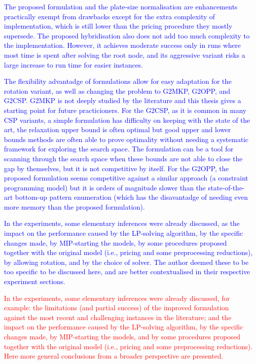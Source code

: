 \documentclass[ppgc,tese,english,formais,babel]{iiufrgs}
\newif\iffinalversion
\newcommand{\newtext}[1]{\iffinalversion%
#1%
\else%
\textcolor{blue}{#1}%
\fi%
}
\newcommand{\oldtext}[1]{\iffinalversion%
\else%
\textcolor{red}{#1}%
\fi%
}
\begin{document}
\newtext{
The proposed formulation and the plate-size normalisation are enhancements practically exempt from drawbacks except for the extra complexity of implementation, which is still lower than the pricing procedure they mostly supersede. The proposed hybridisation also does not add too much complexity to the implementation. However, it achieves moderate success only in runs where most time is spent after solving the root node, and its aggressive variant risks a large increase to run time for easier instances.
}

\newtext{
The flexibility advantadge of formulations allow for easy adaptation for the rotation variant, as well as changing the problem to G2MKP, G2OPP, and G2CSP.
G2MKP is not deeply studied by the literature and this thesis gives a starting point for future practicioners.
For the G2CSP, as it is common in many CSP variants, a simple formulation has difficulty on keeping with the state of the art, the relaxation upper bound is often optimal but good upper and lower bounds methods are often able to prove optimality without needing a systematic framework for exploring the search space.
The formulation can be a tool for scanning through the search space when these bounds are not able to close the gap by themselves, but it is not competitive by itself.
For the G2OPP, the proposed formulation seems competitive against a similar approach (a constraint programming model) but it is orders of magnitude slower than the state-of-the-art bottom-up pattern enumeration (which has the disavantadge of needing even more memory than the proposed formulation).
}

\newtext{
In the experiments, some elementary inferences were already discussed, as the impact on the performance caused by the LP-solving algorithm, by the specific changes made, by MIP-starting the models, by some procedures proposed together with the original model (i.e., pricing and some preprocessing reductions), by allowing rotation, and by the choice of solver.
The author deemed these to be too specific to be discussed here, and are better contextualised in their respective experiment sections.
}
\oldtext{
In the experiments, some elementary inferences were already discussed, for example: the limitations (and partial success) of the improved formulation against the most recent and challenging instances in the literature; and the impact on the performance caused by the LP-solving algorithm, by the specific changes made, by MIP-starting the models, and by some procedures proposed together with the original model (i.e., pricing and some preprocessing reductions).
Here more general conclusions from a broader perspective are presented.
}
\end{document}
